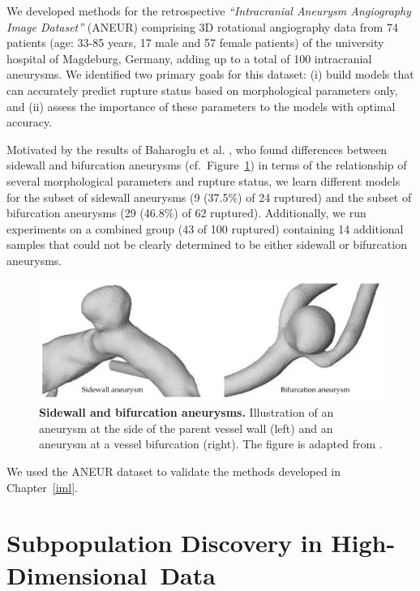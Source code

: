 \documentclass[
  oneside]{book}
\begin{document}
We developed methods for the retrospective \emph{``Intracranial Aneurysm Angiography Image Dataset''} (ANEUR) comprising 3D rotational angiography data from 74 patients (age: 33-85 years, 17 male and 57 female patients) of the university hospital of Magdeburg, Germany, adding up to a total of 100 intracranial aneurysms.
We identified two primary goals for this dataset: (i) build models that can accurately predict rupture status based on morphological parameters only, and (ii) assess the importance of these parameters to the models with optimal accuracy.

Motivated by the results of Baharoglu et al. \autocite{BaharogluEtAl:Neurosurgery2012}, who found differences between sidewall and bifurcation aneurysms (cf.~Figure~\ref{fig:02-aneur-sw-bf}) in terms of the relationship of several morphological parameters and rupture status, we learn different models for the subset of sidewall aneurysms (9 (37.5\%) of 24 ruptured) and the subset of bifurcation aneurysms (29 (46.8\%) of 62 ruptured).
Additionally, we run experiments on a combined group (43 of 100 ruptured) containing 14 additional samples that could not be clearly determined to be either sidewall or bifurcation aneurysms.



\begin{figure}[htb]

{\centering \includegraphics[width=1\linewidth]{figures/02-aneur-sw-bf} 

}

\caption{\textbf{Sidewall and bifurcation aneurysms.} Illustration of an aneurysm at the side of the parent vessel wall (left) and an aneurysm at a vessel bifurcation (right). The figure is adapted from \autocite{Niemann:CBMS2018}.}\label{fig:02-aneur-sw-bf}
\end{figure}

We used the ANEUR dataset to validate the methods developed in Chapter~\ref{iml}.

\hypertarget{part-subpopulation-discovery-in-high-dimensional-data}{%
\part{Subpopulation Discovery in High-Dimensional~Data}\label{part-subpopulation-discovery-in-high-dimensional-data}}
\end{document}
